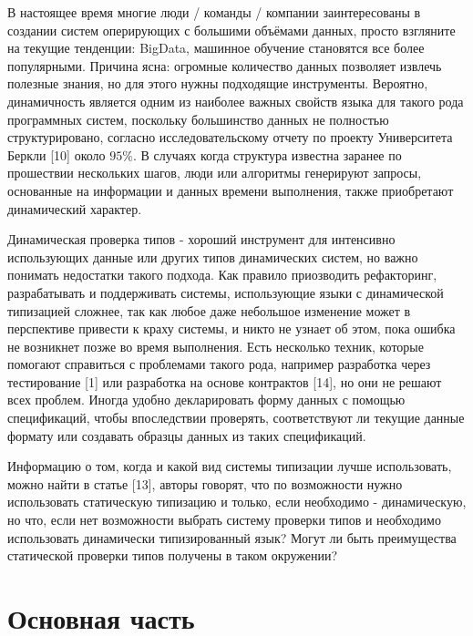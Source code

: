 \documentclass[a4paper,14pt]{extreport}
\begin{document}
В настоящее время многие люди / команды / компании заинтересованы в создании
систем оперирующих с большими объёмами данных, просто взгляните на текущие
тенденции: BigData, машинное обучение становятся все более популярными. Причина
ясна: огромные количество данных позволяет извлечь полезные знания, но для этого
нужны подходящие инструменты. Вероятно, динамичность является одним из наиболее
важных свойств языка для такого рода программных систем, поскольку большинство
данных не полностью структурировано, согласно исследовательскому отчету по
проекту Университета Беркли [10] около $95\%$. В случаях когда структура
известна заранее по прошествии нескольких шагов, люди или алгоритмы генерируют
запросы, основанные на информации и данных времени выполнения, также приобретают
динамический характер.

Динамическая проверка типов - хороший инструмент для интенсивно использующих
данные или других типов динамических систем, но важно понимать недостатки такого
подхода. Как правило приозводить рефакторинг, разрабатывать и поддерживать
системы, использующие языки с динамической типизацией сложнее, так как любое
даже небольшое изменение может в перспективе привести к краху системы, и никто
не узнает об этом, пока ошибка не возникнет позже во время выполнения. Есть
несколько техник, которые помогают справиться с проблемами такого рода, например
разработка через тестирование [1] или разработка на основе контрактов [14], но
они не решают всех проблем. Иногда удобно декларировать форму данных с помощью
спецификаций, чтобы впоследствии проверять, соответствуют ли текущие данные
формату или создавать образцы данных из таких спецификаций.

Информацию о том, когда и какой вид системы типизации лучше использовать, можно
найти в статье [13], авторы говорят, что по возможности нужно использовать
статическую типизацию и только, если необходимо - динамическую, но что, если нет
возможности выбрать систему проверки типов и необходимо использовать динамически
типизированный язык? Могут ли быть преимущества статической проверки типов
получены в таком окружении?

\chapter*{Основная часть}




\end{document}
